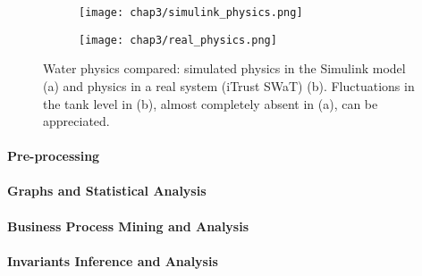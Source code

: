 \pagebreak
\begin{figure}[ht]
	\centering
	\begin{subfigure}{0.9\textwidth}
		\texttt{[image: chap3/simulink\_physics.png]}
		\caption{}
		\label{subfig:simulink_physics}
	\end{subfigure}
	\hfill
	\begin{subfigure}{0.9\textwidth}
		\texttt{[image: chap3/real\_physics.png]}
		\caption{}
		\label{subfig:real_physics}
	\end{subfigure}
	\caption{Water physics compared: simulated physics in the Simulink model (a) and physics in a real system (iTrust SWaT) (b). Fluctuations in the tank level in (b), almost completely absent in (a), can be appreciated.}
	\label{fig:testbed_physics}
\end{figure}

\paragraph{Pre-processing}
\label{par:limit_ceccato_preproc}

\paragraph{Graphs and Statistical Analysis}
\label{par:limit_ceccato_graphs}

\paragraph{Business Process Mining and Analysis}
\label{par:limit_ceccato_pm}

\paragraph{Invariants Inference and Analysis}
\label{par:limit_ceccato_invariants}

\vfill
\nolinenumbers
